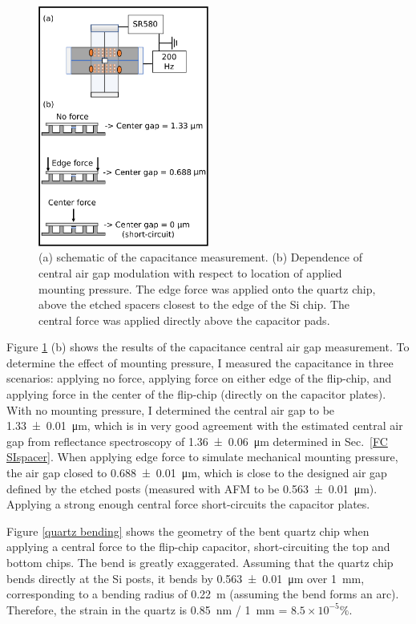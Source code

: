 \documentclass{beavtex_dub_edit}
\begin{document}
\begin{figure}
    \includegraphics[width = 0.5\textwidth]{FC capacitance measurement.pdf}
    \caption{(a) schematic of the capacitance measurement. (b) Dependence of central air gap modulation with respect to location of applied mounting pressure. The edge force was applied onto the quartz chip, above the etched spacers closest to the edge of the Si chip. The central force was applied directly above the capacitor pads.}
    \label{FC cap measurement}
\end{figure}



Figure \ref{FC cap measurement} (b) shows the results of the capacitance central air gap measurement. To determine the effect of mounting pressure, I measured the capacitance in three scenarios: applying no force, applying force on either edge of the flip-chip, and applying force in the center of the flip-chip (directly on the capacitor plates). With no mounting pressure, I determined the central air gap to be \SI{1.33(1)}{\micro\meter}, which is in very good agreement with the estimated central air gap from reflectance spectroscopy of \SI{1.36(6)}{\micro\meter} determined in Sec.\ \ref{FC SIspacer}. When applying edge force to simulate mechanical mounting pressure, the air gap closed to  \SI{0.688(10)}{\micro\meter}, which is close to the designed air gap defined by the etched posts (measured with AFM to be \SI{0.563(10)}{\micro\meter}). Applying a strong enough central force short-circuits the capacitor plates. 

Figure \ref{quartz bending} shows the geometry of the bent quartz chip when applying a central force to the flip-chip capacitor, short-circuiting the top and bottom chips. The bend is greatly exaggerated. Assuming that the quartz chip bends directly at the Si posts, it bends by \SI{0.563(10)}{\micro\meter} over \SI{1}{\milli\meter}, corresponding to a bending radius of \SI{0.22}{\meter} (assuming the bend forms an arc). Therefore, the strain in the quartz is \SI{0.85}{\nano\meter} / \SI{1}{\milli\meter} = $8.5 \times 10^{-5} \% $.
\end{document}
